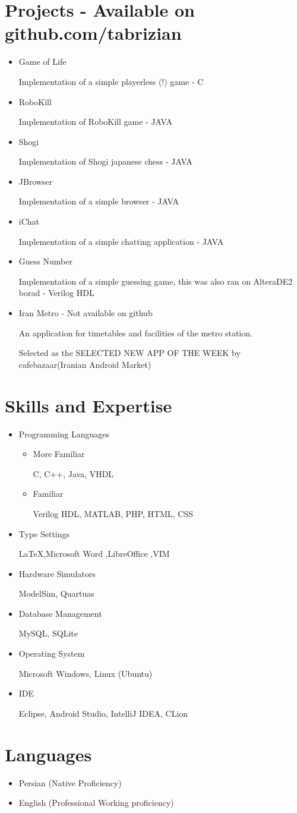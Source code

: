 \documentclass[11pt,a4paper,sans]{moderncv}
\begin{document}
\section{ Projects - Available on github.com/tabrizian}
\begin{itemize}
    \item Game of Life

        Implementation of a simple playerless (!) game - C
    \item RoboKill

        Implementation of RoboKill game - JAVA
    \item Shogi

        Implementation of Shogi japanese chess - JAVA
    \item JBrowser

        Implementation of a simple browser - JAVA
    \item iChat

        Implementation of a simple chatting application - JAVA
    \item Guess Number

        Implementation of a simple guessing game, this was also ran on AlteraDE2 borad - Verilog HDL
    \item Iran Metro - Not available on github

        An application for timetables and facilities of the metro station.

        Selected as the SELECTED NEW APP OF THE WEEK by cafebazaar(Iranian Android Market)
\end{itemize}
\section{Skills and Expertise}
\begin{itemize}
    \item Programming Languages
        \begin{itemize}
            \item More Familiar

                C, C++, Java, VHDL
            \item Familiar

                Verilog HDL, MATLAB, PHP, HTML, CSS
        \end{itemize}
    \item Type Settings

        \LaTeX ,Microsoft Word ,LibreOffice ,VIM
    \item Hardware Simulators

        ModelSim, Quartuas
    \item Database Management

        MySQL, SQLite
    \item Operating System

        Microsoft Windows, Linux (Ubuntu)
    \item IDE

        Eclipse, Android Studio, IntelliJ IDEA, CLion
\end{itemize}

\section{ Languages}
\begin{itemize}
    \item Persian (Native Proficiency)
    \item English (Professional Working proficiency)
\end{itemize}
\end{document}
